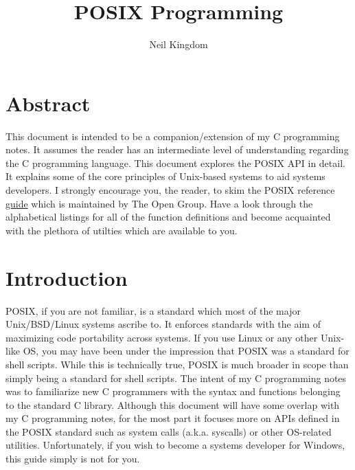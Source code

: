 \documentclass{article}
\title{POSIX Programming}
\author{Neil Kingdom}
\begin{document}
\begin{titlingpage}

\maketitle

\end{titlingpage}

\newpage

\tableofcontents

\newpage

\section{Abstract}

This document is intended to be a companion/extension of my C programming notes. It assumes the reader has an
intermediate level of understanding regarding the C programming language. This document explores the POSIX API
in detail. It explains some of the core principles of Unix-based systems to aid systems developers. I strongly
encourage you, the reader, to skim the POSIX reference \href{https://pubs.opengroup.org/onlinepubs/9699919799/nframe.html}{guide}
which is maintained by The Open Group. Have a look through the alphabetical listings for all of the function
definitions and become acquainted with the plethora of utilties which are available to you.

\section{Introduction}

POSIX, if you are not familiar, is a standard which most of the major Unix/BSD/Linux systems ascribe to. It
enforces standards with the aim of maximizing code portability across systems. If you use Linux or any other
Unix-like OS, you may have been under the impression that POSIX was a standard for shell scripts. While this
is technically true, POSIX is much broader in scope than simply being a standard for shell scripts. The intent
of my C programming notes was to familiarize new C programmers with the syntax and functions belonging to the
standard C library. Although this document will have some overlap with my C programming notes, for the most
part it focuses more on APIs defined in the POSIX standard such as system calls (a.k.a. syscalls) or other
OS-related utilities. Unfortunately, if you wish to become a systems developer for Windows, this guide simply
is not for you.
\end{document}
